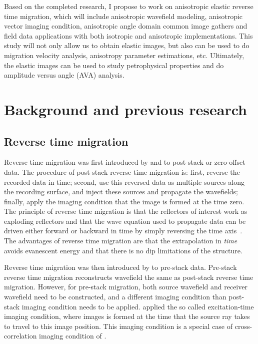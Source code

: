 Based on the completed research, I propose to work on anisotropic elastic reverse time migration, which will include anisotropic wavefield modeling, anisotropic vector imaging condition, anisotropic angle domain common image gathers and field data applications with both isotropic and anisotropic implementations. 
This study will not only allow us to obtain elastic images, but also can be used to do migration velocity analysis, anisotropy parameter estimations, etc. Ultimately, the elastic images can be used to study petrophysical properties and do amplitude versus angle (AVA) analysis.







\section{Background and previous research}
\subsection{Reverse time migration}

Reverse time migration was first introduced by \cite{SEG-1983-S10.1} and \cite{GEO48-11-15141524} to post-stack or zero-offset data. The procedure of post-stack reverse time migration is: first, reverse the recorded data in time; second, use this reversed data as multiple sources along the recording surface, and inject these sources and propagate the wavefields; finally, apply the imaging condition that the image is formed at the time zero. The principle of reverse time migration is that the reflectors of interest work as exploding reflectors and that the wave equation used to propagate data can be driven either forward or backward in time by simply reversing the time axis~\cite[]{levin:581}.
The advantages of reverse time migration are that the extrapolation in \emph{time} avoids evanescent energy and that there is no dip limitations of the structure. 

Reverse time migration was then introduced by \cite{chang:67} to pre-stack data. Pre-stack reverse time migration reconstructs wavefield the same as post-stack reverse time migration. However, for pre-stack migration, both source wavefield and receiver wavefield need to be constructed, and a different imaging condition than post-stack imaging condition needs to be applied. \cite{chang:67} applied the so called  excitation-time imaging condition, where images is formed at the time that the source ray takes to travel to this image position. This imaging condition is a special case of cross-correlation imaging condition of \cite{Claerbout.iei}.
 
